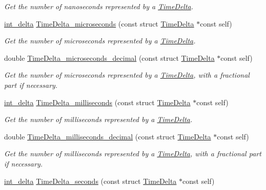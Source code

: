 \begin{DoxyCompactItemize}
\begin{DoxyCompactList}\small\item\em \-Get the number of nanoseconds represented by a \hyperlink{structTimeDelta}{\-Time\-Delta}. \end{DoxyCompactList}\item 
\hyperlink{types_8h_a8a67cf99971c5cfeeaa2380ba84a4c92}{int\-\_\-delta} \hyperlink{time-delta_8h_a64740843f3016de2bddd73ca40dc6465}{\-Time\-Delta\-\_\-microseconds} (const struct \hyperlink{structTimeDelta}{\-Time\-Delta} $\ast$const self)
\begin{DoxyCompactList}\small\item\em \-Get the number of microseconds represented by a \hyperlink{structTimeDelta}{\-Time\-Delta}. \end{DoxyCompactList}\item 
double \hyperlink{time-delta_8h_a7ded3314113cc38a3bc4034099f11ac1}{\-Time\-Delta\-\_\-microseconds\-\_\-decimal} (const struct \hyperlink{structTimeDelta}{\-Time\-Delta} $\ast$const self)
\begin{DoxyCompactList}\small\item\em \-Get the number of microseconds represented by a \hyperlink{structTimeDelta}{\-Time\-Delta}, with a fractional part if necessary. \end{DoxyCompactList}\item 
\hyperlink{types_8h_a8a67cf99971c5cfeeaa2380ba84a4c92}{int\-\_\-delta} \hyperlink{time-delta_8h_a7862999bc76772c28b49e682470c49da}{\-Time\-Delta\-\_\-milliseconds} (const struct \hyperlink{structTimeDelta}{\-Time\-Delta} $\ast$const self)
\begin{DoxyCompactList}\small\item\em \-Get the number of milliseconds represented by a \hyperlink{structTimeDelta}{\-Time\-Delta}. \end{DoxyCompactList}\item 
double \hyperlink{time-delta_8h_ac26e47832931d4fce592fbb6d49248aa}{\-Time\-Delta\-\_\-milliseconds\-\_\-decimal} (const struct \hyperlink{structTimeDelta}{\-Time\-Delta} $\ast$const self)
\begin{DoxyCompactList}\small\item\em \-Get the number of milliseconds represented by a \hyperlink{structTimeDelta}{\-Time\-Delta}, with a fractional part if necessary. \end{DoxyCompactList}\item 
\hyperlink{types_8h_a8a67cf99971c5cfeeaa2380ba84a4c92}{int\-\_\-delta} \hyperlink{time-delta_8h_ac63d87ff8c98e5659dd3984b2e4cb180}{\-Time\-Delta\-\_\-seconds} (const struct \hyperlink{structTimeDelta}{\-Time\-Delta} $\ast$const self)

\end{DoxyCompactItemize}
